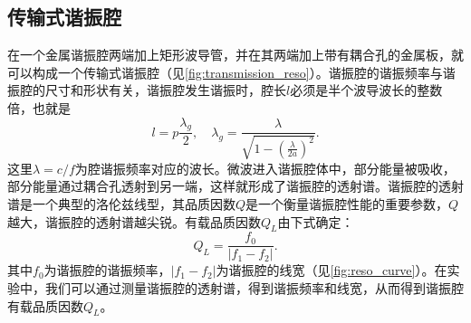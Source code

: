 \documentclass[font=default]{mpltx}
\begin{document}
\subsection{传输式谐振腔}
在一个金属谐振腔两端加上矩形波导管，并在其两端加上带有耦合孔的金属板，就可以构成一个传输式谐振腔（见\autoref{fig:transmission_reso}）。谐振腔的谐振频率与谐振腔的尺寸和形状有关，谐振腔发生谐振时，腔长$l$必须是半个波导波长的整数倍，也就是$$l=p\frac{\lambda_g}{2},\quad \lambda_g=\frac{\lambda}{\sqrt{1-\left(\frac{\lambda}{2a}\right)^2}}.$$这里$\lambda=c/f$为腔谐振频率对应的波长。微波进入谐振腔体中，部分能量被吸收，部分能量通过耦合孔透射到另一端，这样就形成了谐振腔的透射谱。谐振腔的透射谱是一个典型的洛伦兹线型，其品质因数$Q$是一个衡量谐振腔性能的重要参数，$Q$越大，谐振腔的透射谱越尖锐。有载品质因数$Q_L$由下式确定：$$Q_L=\frac{f_0}{|f_1-f_2|}.$$其中$f_0$为谐振腔的谐振频率，$|f_1-f_2|$为谐振腔的线宽（见\autoref{fig:reso_curve}）。在实验中，我们可以通过测量谐振腔的透射谱，得到谐振频率和线宽，从而得到谐振腔有载品质因数$Q_L$。
\end{document}

